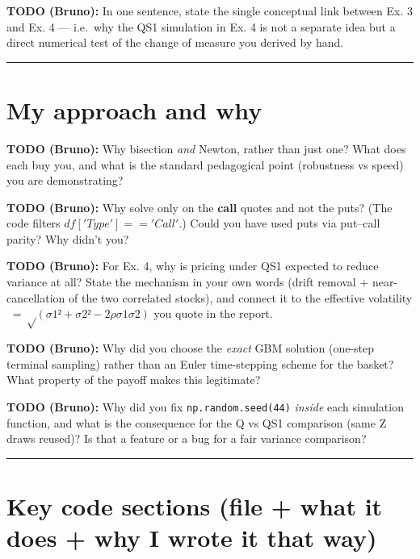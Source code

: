 \documentclass[
  11pt,
]{article}
\begin{document}
\textbf{TODO (Bruno):} In one sentence, state the single conceptual link
between Ex. 3 and Ex. 4 --- i.e.~why the QS1 simulation in Ex. 4 is not
a separate idea but a direct numerical test of the change of measure you
derived by hand.

\begin{center}\rule{0.5\linewidth}{0.5pt}\end{center}

\hypertarget{my-approach-and-why}{%
\section{My approach and why}\label{my-approach-and-why}}

\textbf{TODO (Bruno):} Why bisection \emph{and} Newton, rather than just
one? What does each buy you, and what is the standard pedagogical point
(robustness vs speed) you are demonstrating?

\textbf{TODO (Bruno):} Why solve only on the \textbf{call} quotes and
not the puts? (The code filters \(df['Type'] == 'Call'\).) Could you
have used puts via put--call parity? Why didn't you?

\textbf{TODO (Bruno):} For Ex. 4, why is pricing under QS1 expected to
reduce variance at all? State the mechanism in your own words (drift
removal + near-cancellation of the two correlated stocks), and connect
it to the effective volatility \( = √(σ1²+σ2²−2ρσ1σ2)\) you quote in
the report.

\textbf{TODO (Bruno):} Why did you choose the \emph{exact} GBM solution
(one-step terminal sampling) rather than an Euler time-stepping scheme
for the basket? What property of the payoff makes this legitimate?

\textbf{TODO (Bruno):} Why did you fix \texttt{np.random.seed(44)}
\emph{inside} each simulation function, and what is the consequence for
the Q vs QS1 comparison (same Z draws reused)? Is that a feature or a
bug for a fair variance comparison?

\begin{center}\rule{0.5\linewidth}{0.5pt}\end{center}

\hypertarget{key-code-sections-file-what-it-does-why-i-wrote-it-that-way}{%
\section{Key code sections (file + what it does + why I wrote it that
way)}\label{key-code-sections-file-what-it-does-why-i-wrote-it-that-way}}
\end{document}
